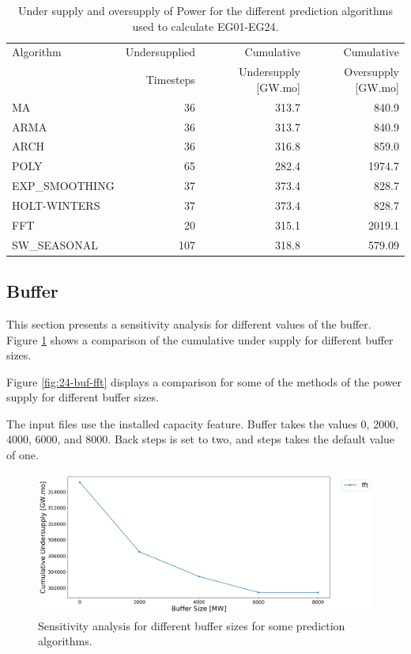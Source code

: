 \documentclass[11pt]{article}
\begin{document}
\begin{table}[H]
	\centering
	\caption{Under supply and oversupply of Power for the different prediction algorithms used to calculate EG01-EG24.}
	\label{tab:24-lin-power}
	\begin{tabularx}{\textwidth}{lRRR}
		\hline
		Algorithm & Undersupplied & Cumulative  & Cumulative \\
		& Timesteps     & Undersupply [GW.mo]  & Oversupply [GW.mo] \\ \hline
		MA        & 36 	& 313.7 & 840.9 \\ 
		ARMA      & 36 	& 313.7 & 840.9 \\ 
		ARCH      & 36 	& 316.8 & 859.0 \\ 
		POLY      &  65 & 282.4 & 1974.7 \\ 
		EXP\_SMOOTHING 	& 37 & 373.4 & 828.7 \\ 
		HOLT-WINTERS  	& 37 & 373.4 & 828.7 \\ 
		FFT       & 20	& 315.1	& 2019.1 \\ 
		SW\_SEASONAL    & 107 & 318.8 & 579.09 \\ \hline
	\end{tabularx}
\end{table}

\subsection{Buffer}

This section presents a sensitivity analysis for different values of the buffer. Figure \ref{fig:24-buff} shows a comparison of the cumulative under supply for different buffer sizes.

Figure \ref{fig:24-buf-fft} displays a comparison for some of the methods of the power supply for different buffer sizes.

The input files use the installed capacity feature. Buffer takes the values 0, 2000, 4000, 6000, and 8000. Back steps is set to two, and steps takes the default value of one.

\begin{figure}[H]
	\centering
	\includegraphics[width=\textwidth]{24-figures/24-sens-buffer.png} 
	\hfill
	\caption{Sensitivity analysis for different buffer sizes for some prediction algorithms.}
	\label{fig:24-buff}
\end{figure}
\end{document}
